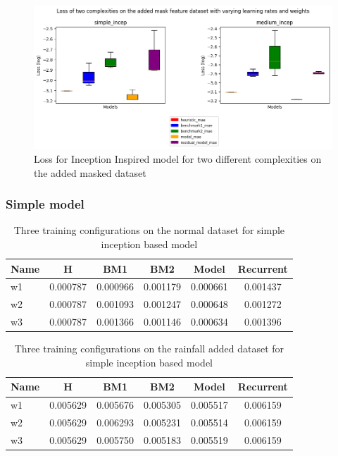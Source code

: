\begin{figure}[tbph]
	\centering
	\includegraphics[width=0.8\linewidth, height=0.3\textheight]{Figures/Results/Inception_model/mask_dataset}
	\caption[Loss for Inception Inspired model for two different complexities on the added mask dataset]{Loss for Inception Inspired model for two different complexities on the added masked dataset}
	\label{fig:incep-maskdset}
\end{figure}

\subsubsection*{Simple model}
\begin{table}[htbp]
	\centering
	\caption{Three training configurations on the normal dataset for simple inception based model}
	\label{tab:simple_normal}
	\begin{tabular}{p{2cm}ccccc}
		\toprule
		Name &  H &  BM1 &  BM2 &  Model &  Recurrent \\
		\midrule
		w1 &       0.000787 &        0.000966 &        0.001179 &   0.000661 &            0.001437 \\
		w2 &       0.000787 &        0.001093 &        0.001247 &   0.000648 &            0.001272 \\
		w3 &       0.000787 &        0.001366 &        0.001146 &   0.000634 &            0.001396 \\
		\bottomrule
	\end{tabular}
\end{table}

\begin{table}[htbp]
	\centering
	\caption{Three training configurations on the rainfall added dataset for simple inception based model}
	\label{tab:simple_rf}
	\begin{tabular}{p{2cm}ccccc}
		\toprule
		Name &  H &  BM1 &  BM2 &  Model &  Recurrent \\
		\midrule
		w1 &       0.005629 &        0.005676 &        0.005305 &   0.005517 &            0.006159 \\
		w2 &       0.005629 &        0.006293 &        0.005231 &   0.005514 &            0.006159 \\
		w3 &       0.005629 &        0.005750 &        0.005183 &   0.005519 &            0.006159 \\
		\bottomrule
	\end{tabular}
\end{table}

